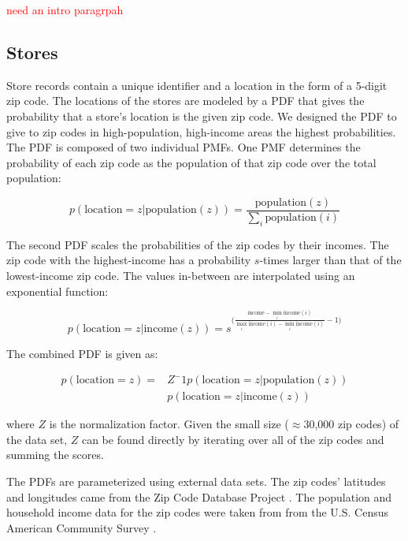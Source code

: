 \documentclass[conference]{IEEEtran}
\begin{document}
\textcolor{red}{need an intro paragrpah}

\subsection{Stores}


Store records contain a unique identifier and a location in the form of a 5-digit zip code.  The locations of the stores are modeled by a PDF that gives the probability that a store's location is the given zip code. We designed the PDF to give to zip codes in high-population, high-income areas the highest probabilities. The PDF is composed of two individual PMFs. One PMF determines the probability of each zip code as the population of that zip code over the total population:

\begin{equation}
p(\text{location}=z | \text{population}(z)) = \frac{\text{population}(z)}{\sum_{i} \text{population}(i)}
\end{equation}

The second PDF scales the probabilities of the zip codes by their incomes.  The zip code with the highest-income has a probability $s$-times larger than that of the lowest-income zip code. The values in-between are interpolated using an exponential function:


\begin{equation}
p(\text{location}=z | \text{income}(z)) = s ^ {\big( \frac{\text{income} - \min_i{\textrm{income}(i)}} {\max_i{\textrm{income}(i)} - \min_i{\textrm{income}(i)}} - 1 \big)}
\end{equation}

The combined PDF is given as: 

\begin{align}
p(\text{location}=z) = &Z^-1 p(\text{location}=z | \text{population}(z)) \nonumber \\
&p(\text{location}=z | \text{income}(z))
\end{align}


where $Z$ is the normalization factor.  Given the small size ($\approx$30,000 zip codes) of the data set, $Z$ can be found directly by iterating over all of the zip codes and summing the scores.

The PDFs are parameterized using external data sets.  The zip codes' latitudes and longitudes came from the Zip Code Database Project \cite{Zips}.  The population and household income data for the zip codes were taken from from the U.S. Census American Community Survey \cite{ACS}. 
\end{document}
